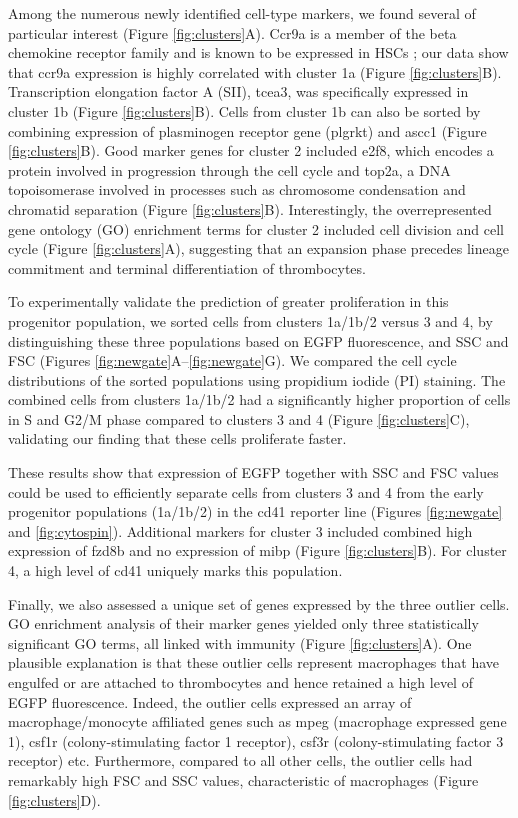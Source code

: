 Among the numerous newly identified cell-type markers, we found several of particular interest (Figure \ref{fig:clusters}A). Ccr9a is a member of the beta chemokine receptor family and is known to be expressed in HSCs \cite{Wright2002-xi}; our data show that ccr9a expression is highly correlated with cluster 1a (Figure \ref{fig:clusters}B). Transcription elongation factor A (SII), tcea3, was specifically expressed in cluster 1b (Figure \ref{fig:clusters}B). Cells from cluster 1b can also be sorted by combining expression of plasminogen receptor gene (plgrkt) and ascc1 (Figure \ref{fig:clusters}B). Good marker genes for cluster 2 included e2f8, which encodes a protein involved in progression through the cell cycle \cite{Deng2010-am} and top2a, a DNA topoisomerase involved in processes such as chromosome condensation and chromatid separation  \cite{Downes1994-sl} (Figure \ref{fig:clusters}B). Interestingly, the overrepresented gene ontology (GO) enrichment terms for cluster 2 included cell division and cell cycle (Figure \ref{fig:clusters}A), suggesting that an expansion phase precedes lineage commitment and terminal differentiation of thrombocytes.

To experimentally validate the prediction of greater proliferation in this progenitor population, we sorted cells from clusters 1a/1b/2 versus 3 and 4, by distinguishing these three populations based on EGFP fluorescence, and SSC and FSC (Figures \ref{fig:newgate}A–\ref{fig:newgate}G). We compared the cell cycle distributions of the sorted populations using propidium iodide (PI) staining. The combined cells from clusters 1a/1b/2 had a significantly higher proportion of cells in S and G2/M phase compared to clusters 3 and 4 (Figure \ref{fig:clusters}C), validating our finding that these cells proliferate faster.

These results show that expression of EGFP together with SSC and FSC values could be used to efficiently separate cells from clusters 3 and 4 from the early progenitor populations (1a/1b/2) in the cd41 reporter line (Figures \ref{fig:newgate} and \ref{fig:cytospin}). Additional markers for cluster 3 included combined high expression of fzd8b and no expression of mibp (Figure \ref{fig:clusters}B). For cluster 4, a high level of cd41 uniquely marks this population.

Finally, we also assessed a unique set of genes expressed by the three outlier cells. GO enrichment analysis of their marker genes yielded only three statistically significant GO terms, all linked with immunity (Figure \ref{fig:clusters}A). One plausible explanation is that these outlier cells represent macrophages that have engulfed or are attached to thrombocytes and hence retained a high level of EGFP fluorescence. Indeed, the outlier cells expressed an array of macrophage/monocyte affiliated genes such as mpeg (macrophage expressed gene 1), csf1r (colony-stimulating factor 1 receptor), csf3r (colony-stimulating factor 3 receptor) etc. Furthermore, compared to all other cells, the outlier cells had remarkably high FSC and SSC values, characteristic of macrophages (Figure \ref{fig:clusters}D).

